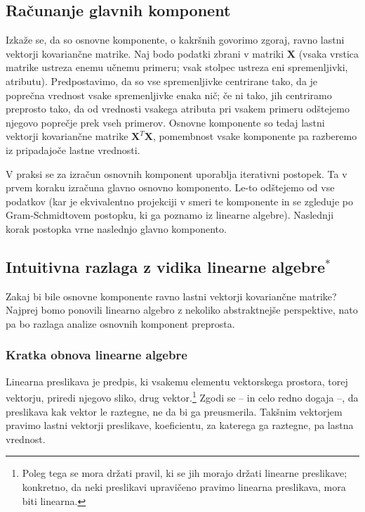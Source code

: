 \subsection{Računanje glavnih komponent}

Izkaže se, da so osnovne komponente, o kakršnih govorimo zgoraj, ravno lastni vektorji kovariančne matrike. Naj bodo podatki zbrani v matriki $\mathbf{X}$ (vsaka vrstica matrike ustreza enemu učnemu primeru; vsak stolpec ustreza eni spremenljivki, atributu). Predpostavimo, da so vse spremenljivke centrirane tako, da je poprečna vrednost vsake spremenljivke enaka nič; če ni tako, jih centriramo preprosto tako, da od vrednosti vsakega atributa pri vsakem primeru odštejemo njegovo poprečje prek vseh primerov. Osnovne komponente so tedaj lastni vektorji kovariančne matrike $\mathbf{X}^T\mathbf{X}$, pomembnost vsake komponente pa razberemo iz pripadajoče lastne vrednosti.

V praksi se za izračun osnovnih komponent uporablja iterativni postopek. Ta v prvem koraku izračuna glavno osnovno komponento. Le-to odštejemo od vse podatkov (kar je ekvivalentno projekciji v smeri te komponente in se zgleduje po Gram-Schmidtovem postopku, ki ga poznamo iz linearne algebre). Naslednji korak postopka vrne naslednjo glavno komponento.

\subsection{Intuitivna razlaga z vidika linearne algebre$^*$}

Zakaj bi bile osnovne komponente ravno lastni vektorji kovariančne matrike? Najprej bomo ponovili linearno algebro z nekoliko abstraktnejše perspektive, nato pa bo razlaga analize osnovnih komponent preprosta.


\subsubsection{Kratka obnova linearne algebre}

Linearna preslikava je predpis, ki vsakemu elementu vektorskega prostora, torej vektorju, priredi njegovo sliko, drug vektor.\footnote{Poleg tega se mora držati pravil, ki se jih morajo držati linearne preslikave; konkretno, da neki preslikavi upravičeno pravimo linearna preslikava, mora biti linearna.} Zgodi se -- in celo redno dogaja --, da preslikava kak vektor le raztegne, ne da bi ga preusmerila. Takšnim vektorjem pravimo lastni vektorji preslikave, koeficientu, za katerega ga raztegne, pa lastna vrednost.

